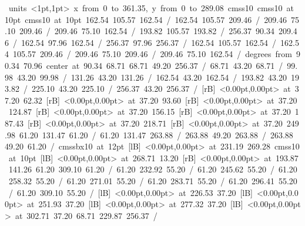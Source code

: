\hbox{\beginpicture
\setcoordinatesystem units <1pt,1pt>
\setplotarea x from 0 to 361.35, y from 0 to 289.08
\setlinear
\font\picfont cmss10\picfont
\font\picfont cmss10 at 10pt\picfont
\font\picfont cmss10 at 10pt\picfont
\setdashpattern <15pt, 15pt, 15pt, 15pt, 15pt, 15pt, 15pt, 15pt>
 162.54 105.57 162.54 /
 162.54 105.57 209.46 /
 209.46 75.10 209.46 /
 209.46 75.10 162.54 /
\setsolid
{} 193.82 105.57 193.82 /
\setdashpattern <4pt, 4pt>
 256.37 90.34 209.46 /
\setsolid
{} 162.54 97.96 162.54 /
\setsolid
{} 256.37 97.96 256.37 /
\setsolid
{} 162.54 105.57 162.54 /
 162.54 105.57 209.46 /
 209.46 75.10 209.46 /
 209.46 75.10 162.54 /
 degrees from 90.34 70.96 center at 90.34 68.71
\setsolid
{} 68.71 49.20 256.37 /
\setsolid
{} 68.71 43.20 68.71 /
\setsolid
{} 99.98 43.20 99.98 /
\setsolid
{} 131.26 43.20 131.26 /
\setsolid
{} 162.54 43.20 162.54 /
\setsolid
{} 193.82 43.20 193.82 /
\setsolid
{} 225.10 43.20 225.10 /
\setsolid
{} 256.37 43.20 256.37 /
 [rB] <0.00pt,0.00pt> at 37.20 62.32
 [rB] <0.00pt,0.00pt> at 37.20 93.60
 [rB] <0.00pt,0.00pt> at 37.20 124.87
 [rB] <0.00pt,0.00pt> at 37.20 156.15
 [rB] <0.00pt,0.00pt> at 37.20 187.43
 [rB] <0.00pt,0.00pt> at 37.20 218.71
 [rB] <0.00pt,0.00pt> at 37.20 249.98
\setsolid
{} 61.20 131.47 61.20 /
 61.20 131.47 263.88 /
 263.88 49.20 263.88 /
 263.88 49.20 61.20 /
\font\picfont cmssbx10 at 12pt\picfont
{}  [lB] <0.00pt,0.00pt> at 231.19 269.28
\font\picfont cmss10 at 10pt\picfont
{}  [lB] <0.00pt,0.00pt> at 268.71 13.20
 [rB] <0.00pt,0.00pt> at 193.87 141.26
\setsolid
{} 61.20 309.10 61.20 /
\setsolid
{} 61.20 232.92 55.20 /
\setsolid
{} 61.20 245.62 55.20 /
\setsolid
{} 61.20 258.32 55.20 /
\setsolid
{} 61.20 271.01 55.20 /
\setsolid
{} 61.20 283.71 55.20 /
\setsolid
{} 61.20 296.41 55.20 /
\setsolid
{} 61.20 309.10 55.20 /
  [lB] <0.00pt,0.00pt> at 226.53 37.20
  [lB] <0.00pt,0.00pt> at 251.93 37.20
  [lB] <0.00pt,0.00pt> at 277.32 37.20
  [lB] <0.00pt,0.00pt> at 302.71 37.20
\setsolid
{} 68.71 229.87 256.37 /
}
